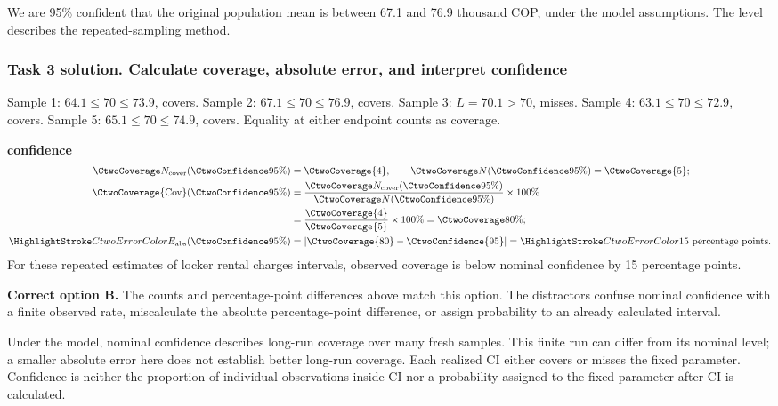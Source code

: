 We are 95\% confident that the original population mean is between 67.1 and 76.9 thousand COP, under the model assumptions. The level describes the repeated-sampling method.
\par\vspace{3mm}
\clearpage
\subsubsection*{Task 3 solution. Calculate coverage, absolute error, and interpret confidence}
\label{sol:c2-1-c}
Sample 1: $64.1\leq 70\leq 73.9$, covers. Sample 2: $67.1\leq 70\leq 76.9$, covers. Sample 3: $L=70.1>70$, misses. Sample 4: $63.1\leq 70\leq 72.9$, covers. Sample 5: $65.1\leq 70\leq 74.9$, covers. Equality at either endpoint counts as coverage.

\textbf{ confidence}\nopagebreak[4]
\begin{align*}
\CtwoCoverCount(\CtwoConfidence{95\%})&=\CtwoCoverage{4},
\qquad\CtwoTotalCount(\CtwoConfidence{95\%})=\CtwoCoverage{5};\\
\CtwoCoverage{\mathrm{Cov}}(\CtwoConfidence{95\%})
&=\frac{\CtwoCoverCount(\CtwoConfidence{95\%})}{\CtwoTotalCount(\CtwoConfidence{95\%})}\times100\%
\\
&=\frac{\CtwoCoverage{4}}{\CtwoCoverage{5}}\times100\%=\CtwoCoverage{80\%};\\
\CtwoError{E_{\rm abs}}(\CtwoConfidence{95\%})
&=\left|\CtwoCoverage{80}-\CtwoConfidence{95}\right|=\CtwoError{15}\ \text{percentage points}.
\end{align*}
For these repeated estimates of locker rental charges intervals, observed coverage is below nominal confidence by 15 percentage points.

\textbf{Correct option B.} The counts and percentage-point differences above match this option. The distractors confuse nominal confidence with a finite observed rate, miscalculate the absolute percentage-point difference, or assign probability to an already calculated interval.

Under the model, nominal confidence describes long-run coverage over many fresh samples. This finite run can differ from its nominal level; a smaller absolute error here does not establish better long-run coverage. Each realized $\mathrm{CI}$ either covers or misses the fixed parameter. Confidence is neither the proportion of individual observations inside $\mathrm{CI}$ nor a probability assigned to the fixed parameter after $\mathrm{CI}$ is calculated.
\par\nopagebreak[4]
\par\vspace{3mm}
\clearpage
